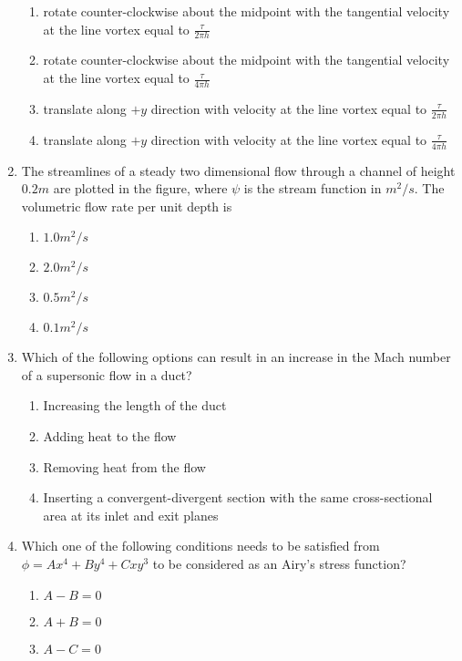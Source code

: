 \documentclass[journal]{IEEEtran}
\begin{document}
\begin{enumerate}
\begin{enumerate}
			\item rotate counter-clockwise about the midpoint with the tangential velocity at the line vortex equal to $\frac{\tau}{2\pi h}$
			\item rotate counter-clockwise about the midpoint with the tangential velocity at the line vortex equal to $\frac{\tau}{4\pi h}$
			\item translate along $+y$ direction with velocity at the line vortex equal to $\frac{\tau}{2\pi h}$
			\item translate along $+y$ direction with velocity at the line vortex equal to $\frac{\tau}{4\pi h}$
		\end{enumerate}
	\item
	The streamlines of a steady two dimensional flow through a channel of height $0.2 m$ are plotted in the figure, where $\psi$ is the stream function in $m^{2}/s$. The volumetric flow rate per unit depth is
	\begin{figure}[H]
    		\centering
    		
    		\caption{}
    		\label{36}
	\end{figure}
		\begin{enumerate}
			\item $1.0 m^{2}/s$
			\item $2.0 m^{2}/s$
			\item $0.5 m^{2}/s$
			\item $0.1 m^{2}/s$
		\end{enumerate}	
	\item 
	Which of the following options can result in an increase in the Mach number of a supersonic flow in a duct?
		\begin{enumerate}
			\item Increasing the length of the duct
			\item Adding heat to the flow
			\item Removing heat from the flow
			\item Inserting a convergent-divergent section with the same cross-sectional area at its inlet and exit planes
		\end{enumerate}
	\item
	Which one of the following conditions needs to be satisfied from $\phi = Ax^{4} + By^{4} + Cxy^{3}$ to be considered as an Airy's stress function?
		\begin{enumerate}
			\item $A - B = 0$
			\item $A + B = 0$
			\item $A - C = 0$

\end{enumerate}
\end{enumerate}
\end{document}
